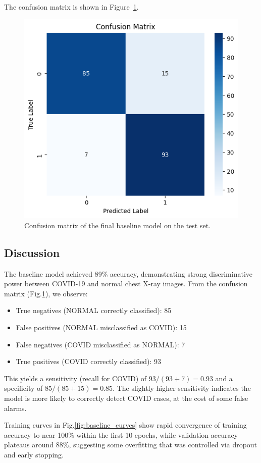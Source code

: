 \documentclass[conference]{IEEEtran}
\begin{document}
The confusion matrix is shown in Figure~\ref{fig:conf_matrix}.

\begin{figure}[htbp]
	\centerline{\includegraphics[width=0.7\linewidth]{Images/confusion_matrix_baseline.png}}
	\caption{Confusion matrix of the final baseline model on the test set.}
	\label{fig:conf_matrix}
\end{figure}

\subsection{Discussion}
The baseline model achieved 89\% accuracy, demonstrating strong discriminative power between COVID-19 and normal chest X-ray images. From the confusion matrix (Fig.\ref{fig:conf_matrix}), we observe:

\begin{itemize}
	\item True negatives (NORMAL correctly classified): 85
	\item False positives (NORMAL misclassified as COVID): 15
	\item False negatives (COVID misclassified as NORMAL): 7
	\item True positives (COVID correctly classified): 93
\end{itemize}

This yields a sensitivity (recall for COVID) of $93/(93+7)=0.93$ and a specificity of $85/(85+15)=0.85$. The slightly higher sensitivity indicates the model is more likely to correctly detect COVID cases, at the cost of some false alarms.  

Training curves in Fig.\ref{fig:baseline_curves} show rapid convergence of training accuracy to near 100\% within the first 10 epochs, while validation accuracy plateaus around 88\%, suggesting some overfitting that was controlled via dropout and early stopping.  
\end{document}
